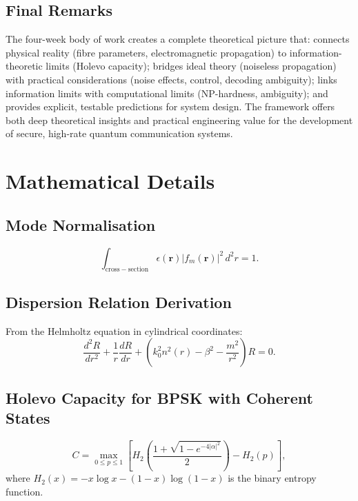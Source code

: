 \documentclass[12pt,a4paper]{article}
\theoremstyle{definition}
\theoremstyle{plain}
\begin{document}
\subsection{Final Remarks}

The four-week body of work creates a complete theoretical picture that:
connects physical reality (fibre parameters, electromagnetic propagation) to
information-theoretic limits (Holevo capacity); bridges ideal theory (noiseless
propagation) with practical considerations (noise effects, control, decoding ambiguity);
links information limits with computational limits (NP-hardness, ambiguity); and
provides explicit, testable predictions for system design. The framework offers both
deep theoretical insights and practical engineering value for the development of secure,
high-rate quantum communication systems.

\appendix

\section{Mathematical Details}

\subsection{Mode Normalisation}
\begin{equation}
\int_{\mathrm{cross-section}}\epsilon(\mathbf{r})|f_m(\mathbf{r})|^2\,d^2r=1.
\end{equation}

\subsection{Dispersion Relation Derivation}
From the Helmholtz equation in cylindrical coordinates:
\begin{equation}
\frac{d^2R}{dr^2}+\frac{1}{r}\frac{dR}{dr}+\left(k_0^2 n^2(r)-\beta^2-\frac{m^2}{r^2}\right)R=0.
\end{equation}

\subsection{Holevo Capacity for BPSK with Coherent States}
\begin{equation}
C=\max_{0\le p\le1}\left[H_2\!\left(\frac{1+\sqrt{1-e^{-4|\alpha|^2}}}{2}\right)-H_2(p)\right],
\end{equation}
where $H_2(x)=-x\log x-(1-x)\log(1-x)$ is the binary entropy function.
\end{document}
